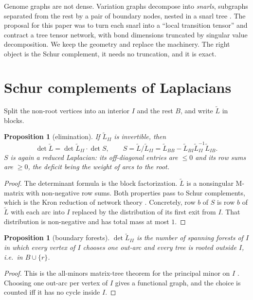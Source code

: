 \documentclass[11pt]{article}
\theoremstyle{plain}
\newtheorem{proposition}[theorem]{Proposition}
\theoremstyle{definition}
\theoremstyle{remark}
\newcommand{\Lt}{\widetilde L}
\begin{document}
Genome graphs are not dense. Variation graphs decompose into \emph{snarls}, subgraphs separated from the
rest by a pair of boundary nodes, nested in a snarl tree \cite{Pat18}. The proposal for this paper was to
turn each snarl into a ``local transition tensor'' and contract a tree tensor network, with bond
dimensions truncated by singular value decomposition. We keep the geometry and replace the machinery. The
right object is the Schur complement, it needs no truncation, and it is exact.

\section{Schur complements of Laplacians}\label{sec:schur}

Split the non-root vertices into an interior $I$ and the rest $B$, and write $\Lt$ in blocks.

\begin{proposition}[elimination]\label{prop:schur}
If $\Lt_{II}$ is invertible, then
\[
\det\Lt=\det\Lt_{II}\cdot\det S,\qquad S=\Lt/\Lt_{II}=\Lt_{BB}-\Lt_{BI}\Lt_{II}^{-1}\Lt_{IB}.
\]
$S$ is again a reduced Laplacian: its off-diagonal entries are $\le0$ and its row sums are $\ge0$, the
deficit being the weight of arcs to the root.
\end{proposition}

\begin{proof}
The determinant formula is the block factorization. $\Lt$ is a nonsingular M-matrix with non-negative
row sums. Both properties pass to Schur complements, which is the Kron reduction of network
theory \cite{DB13}. Concretely, row $b$ of $S$ is row $b$ of $\Lt$ with each arc into $I$ replaced by
the distribution of its first exit from $I$. That distribution is non-negative and has total mass at
most $1$.
\end{proof}

\begin{proposition}[boundary forests]\label{prop:forest}
$\det\Lt_{II}$ is the number of spanning forests of $I$ in which every vertex of $I$ chooses one out-arc
and every tree is rooted outside $I$, i.e.\ in $B\cup\{r\}$.
\end{proposition}

\begin{proof}
This is the all-minors matrix-tree theorem for the principal minor on $I$ \cite{Cha82}. Choosing one
out-arc per vertex of $I$ gives a functional graph, and the choice is counted iff it has no cycle
inside $I$.
\end{proof}
\end{document}
